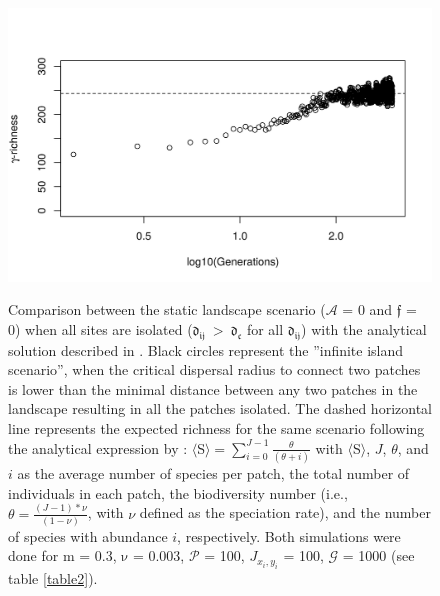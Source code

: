 \documentclass[a4paper,12pt]{article}
\begin{document}
\begin{figure}[hb!]
\begin{center}
\includegraphics[width=\textwidth]{newfigures/steadystate_analyticalsolution_staticscenario.png}
\label{fig:theoretical}
\caption{Comparison between the static landscape scenario ($\mathcal{A}$ = 0 and $\mathfrak{f}$ = 0) when all sites are isolated ($\mathfrak{d_{ij}} ~ > ~ \mathfrak{d_{c}}$ for all $\mathfrak{d_{ij}}$) with the analytical solution described in \cite{vallade2003analytical}. Black circles represent the ''infinite island scenario'', when the critical dispersal radius to connect two patches is lower than the minimal distance between any two patches in the landscape resulting in all the patches isolated. The dashed horizontal line represents the expected richness for the same scenario following the analytical expression by \cite{vallade2003analytical}: $\langle$S$\rangle = \sum_{i=0}^{J -1} \frac{\theta}{(\theta+i)}$ with $\langle$S$\rangle$, $J$, $\theta$, and $i$ as the average number of species per patch, the total number of individuals in each patch, the biodiversity number (i.e., $\theta = \frac{(J-1)*\nu}{(1-\nu)}$, with $\nu$ defined as the speciation rate), and the number of species with abundance $i$, respectively. Both simulations were done for $\mathrm{m}$ = 0.3, $\mathrm{\nu}$ = 0.003, $\mathcal{P}$ = 100, $J_{x_i,y_i}$ = 100, $\mathcal{G}$ = 1000 (see table \ref{table2}).}
\end{center}
\end{figure}
\end{document}
